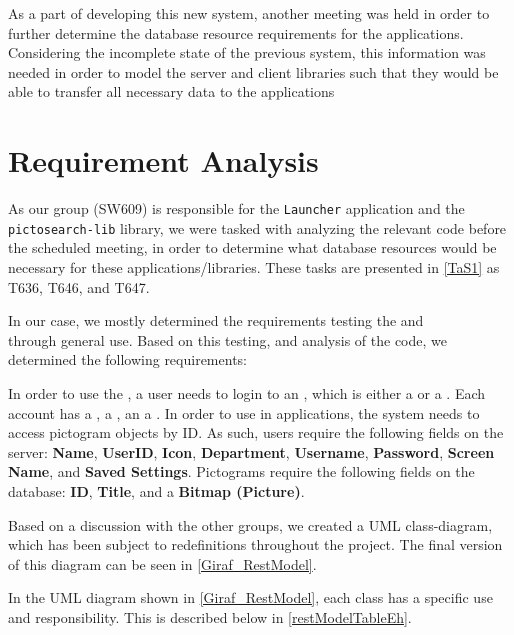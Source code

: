 As a part of developing this new system, another meeting was held in order to further
determine the database resource requirements for the applications. Considering the
incomplete state of the previous system, this information was needed in order to
model the server and client libraries such that they would be able to transfer all
necessary data to the applications

\section{Requirement Analysis}
As our group (SW609) is responsible for the \texttt{Launcher} application and
the \\\texttt{pictosearch-lib} library, we were tasked with analyzing the
relevant code before the scheduled meeting, in order to determine what database resources
would be necessary for these applications/libraries. These tasks are presented
in \autoref{TaS1} as T636, T646, and T647.\nl

In our case, we mostly determined the requirements testing the 
and\\  through general use. Based on this testing, and
analysis of the code, we determined the following requirements:\nl

In order to use the , a user needs to login to an
, which is either a  or a . Each
account has a , a , an a .
In order to use  in applications, the system needs to access
pictogram objects by ID. As such, users require the following fields on the
server: \textbf{Name}, \textbf{UserID}, \textbf{Icon}, \textbf{Department},
\textbf{Username}, \textbf{Password}, \textbf{Screen Name}, and \textbf{Saved
Settings}.
Pictograms require the following fields on the database: \textbf{ID},
\textbf{Title}, and a \textbf{Bitmap (Picture)}.\nl

Based on a discussion with the other groups, we created a UML class-diagram,
which has been subject to redefinitions throughout the project. The final
version of this diagram can be seen in \autoref{Giraf_RestModel}.


In the UML diagram shown in \autoref{Giraf_RestModel}, each class has a
specific use and responsibility. This is described below in
\autoref{restModelTableEh}.

